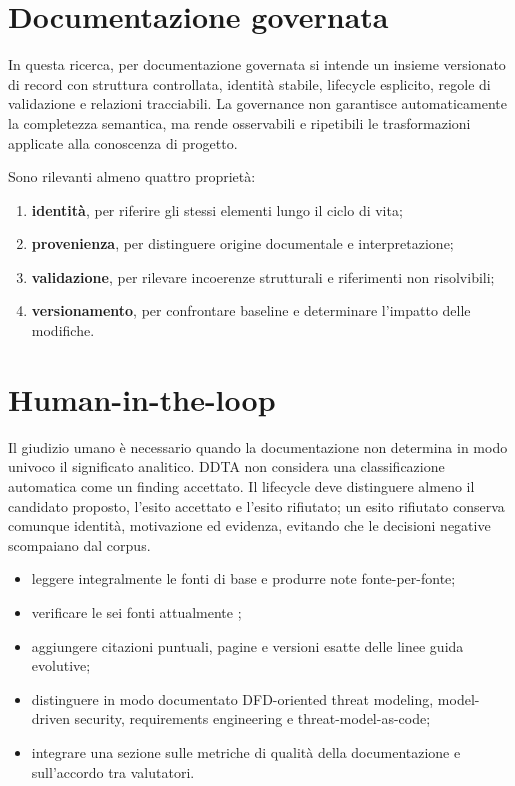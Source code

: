 \documentclass[12pt,a4paper,oneside]{report}
\newcommand{\artifact}[1]{{\ttfamily\seqsplit{#1}}}
\newcommand{\statuslabel}[1]{\par\medskip\noindent{\Large\bfseries\sffamily #1}\par\medskip}
\begin{document}
\section{Documentazione governata}

In questa ricerca, per documentazione governata si intende un insieme versionato di record con struttura controllata, identità stabile, lifecycle esplicito, regole di validazione e relazioni tracciabili. La governance non garantisce automaticamente la completezza semantica, ma rende osservabili e ripetibili le trasformazioni applicate alla conoscenza di progetto.

Sono rilevanti almeno quattro proprietà:

\begin{enumerate}
  \item \textbf{identità}, per riferire gli stessi elementi lungo il ciclo di vita;
  \item \textbf{provenienza}, per distinguere origine documentale e interpretazione;
  \item \textbf{validazione}, per rilevare incoerenze strutturali e riferimenti non risolvibili;
  \item \textbf{versionamento}, per confrontare baseline e determinare l'impatto delle modifiche.
\end{enumerate}

\section{Human-in-the-loop}

Il giudizio umano è necessario quando la documentazione non determina in modo univoco il significato analitico. DDTA non considera una classificazione automatica come un finding accettato. Il lifecycle deve distinguere almeno il candidato proposto, l'esito accettato e l'esito rifiutato; un esito rifiutato conserva comunque identità, motivazione ed evidenza, evitando che le decisioni negative scompaiano dal corpus.

\statuslabel{DA COMPLETARE}

\begin{pendingnote}
\begin{itemize}
  \item leggere integralmente le fonti di base e produrre note fonte-per-fonte;
  \item verificare le sei fonti attualmente \artifact{partially\_verified};
  \item aggiungere citazioni puntuali, pagine e versioni esatte delle linee guida evolutive;
  \item distinguere in modo documentato DFD-oriented threat modeling, model-driven security, requirements engineering e threat-model-as-code;
  \item integrare una sezione sulle metriche di qualità della documentazione e sull'accordo tra valutatori.
\end{itemize}
\end{pendingnote}
\end{document}
